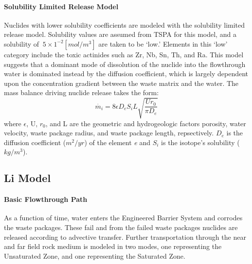 \paragraph{Solubility Limited Release Model}
Nuclides with lower solubility coefficients are modeled with the solubility limited release model. Solubility values are assumed from TSPA for this model, and a solubility of $~5\times 1^{-2} [mol/m^3]$ are taken to be `low.' Elements in this `low' category include the toxic actinides such as Zr, Nb, Sn, Th, and Ra. This model suggests that a dominant mode of dissolution of the nuclide into the flowthrough water is dominated instead by the diffusion coefficient, which is largely dependent upon the concentration gradient between the waste matrix and the water. The mass balance driving nuclide release takes the form:
\begin{equation}
\dot{m_i}=8\epsilon D_eS_iL\sqrt{\frac{Ur_0}{\pi D_e}}
\end{equation}
where $\epsilon$, U, $r_0$, and L are the geometric and hydrogeologic factors porosity, water velocity, waste package radius, and waste package length, repsectively. $D_e$ is the diffusion coefficient ($m^2/yr$) of the element \emph{e} and $S_i$ is the isotope's solubility ($kg/m^3$).

\subsection{Li Model\cite{li_methodology_2006}}
\paragraph{Basic Flowthrough Path}
As a function of time, water enters the Engineered Barrier System and corrodes the waste packages. These fail and from the failed waste packages nuclides are released according to advective transfer. Further transportation through the near and far field rock medium is modeled in two modes, one representing the Unsaturated Zone, and one representing the Saturated Zone.
